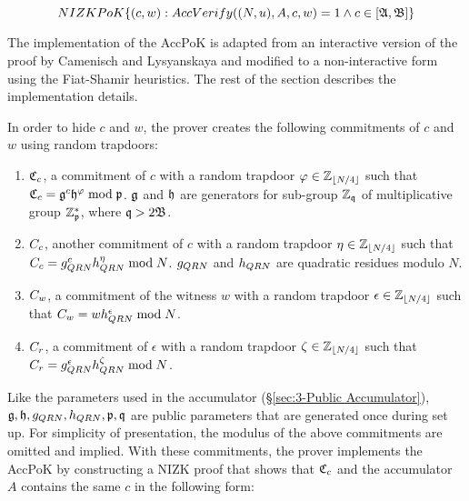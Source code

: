 $$NIZKPoK\{(c,w):AccVerify((N,u),A,c,w)=1 \wedge c \in [\mathfrak{A},\mathfrak{B}]\}$$

The implementation of the AccPoK is adapted from an interactive version of the proof by Camenisch and Lysyanskaya \cite{JanCamenisch12002} and modified to a non-interactive form using the Fiat-Shamir heuristics. The rest of the section describes the implementation details. 

In order to hide $c$ and $w$, the prover creates the following commitments of $c$ and $w$ using random trapdoors:

\begin{enumerate}
	\item $\mathfrak{C}_c$, a commitment of $c$ with a random trapdoor $ \varphi\in\mathbb{Z}_{\lfloor N/4 \rfloor}$ such that $\mathfrak{C}_c=\mathfrak{g}^{c}\mathfrak{h}^{\varphi}\bmod{\mathfrak{p}}$. $\mathfrak{g}$ and $\mathfrak{h}$ are generators for sub-group $\mathbb{Z}_{\mathfrak{q}}$ of multiplicative group $\mathbb{Z}_{\mathfrak{p}}^{*}$, where $\mathfrak{q} >2\mathfrak{B}$.
	\item $C_c$, another commitment of $c$ with a random trapdoor $ \eta\in\mathbb{Z}_{\lfloor N/4 \rfloor}$ such that $C_c=g_{QRN}^{c}h_{QRN}^{\eta}\bmod{N}$. $g_{QRN}$ and $h_{QRN}$ are quadratic residues modulo $N$.
	\item $C_w$, a commitment of the witness $w$ with a random trapdoor $ \epsilon\in\mathbb{Z}_{\lfloor N/4 \rfloor}$ such that $C_w=wh_{QRN}^{\epsilon}\bmod{N}$.
	\item $C_r$, a commitment of $\epsilon$ with a random trapdoor $\zeta\in\mathbb{Z}_{\lfloor N/4 \rfloor}$ such that $C_r=g_{QRN}^{\epsilon}h_{QRN}^{\zeta}\bmod{N}$.
\end{enumerate}

Like the parameters used in the accumulator (\S\ref{sec:3-Public Accumulator}), $\mathfrak{g},\mathfrak{h},g_{QRN},h_{QRN},\mathfrak{p},\mathfrak{q}$ are public parameters that are generated once during set up. For simplicity of presentation, the modulus of the above commitments are omitted and implied. With these commitments, the prover implements the AccPoK by constructing a NIZK proof that shows that $\mathfrak{C}_c$ and the accumulator $A$ contains the same $c$ in the following form:

\eqnAccPoKActual

